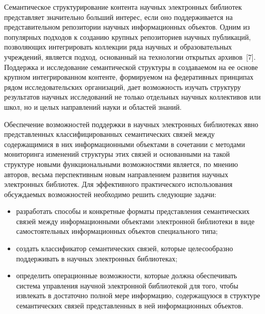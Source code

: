 \begin{multicols}{2}
     Семантическое структурирование контента научных электронных 
библиотек представляет значительно больший интерес, если оно 
поддерживается на представительном репозитории научных информационных 
объектов. Одним из популярных подходов к созданию крупных репозиториев 
научных публикаций, позволяющих интегрировать коллекции ряда научных и 
образовательных учреж\-де\-ний, является подход, основанный на технологии 
открытых архивов~[7]. Поддержка и исследование семантической структуры в 
создаваемом на ее основе крупном интегрированном контенте, формируемом 
на федеративных принципах рядом исследовательских организаций, дает 
возможность изучать структуру результатов научных исследований не только 
отдельных научных коллективов или школ, но и целых направлений науки и 
областей знаний. 
     
     Обеспечение возможностей поддержки в научных электронных 
библиотеках явно представленных классифицированных семантических связей 
между содержащимися в них информационными объектами в сочетании с 
методами мониторинга изменений структуры этих связей и основанными на 
такой структуре новыми функциональными возможностями является, по 
мнению авторов, весьма перспективным новым направлением развития 
научных электронных библиотек. Для эффективного практического 
использования обсуждаемых возможностей необходимо решить следующие 
задачи: 
     \begin{itemize}
\item разработать способы и конкретные форматы представления 
семантических связей между информационными объектами электронной 
библиотеки в виде самостоятельных информационных объектов 
специального типа;
\item создать классификатор семантических связей, которые 
целесообразно поддерживать в научных электронных библиотеках;
\item определить операционные возможности, которые должна 
обеспечивать система управления научной электронной библиотекой для 
того, чтобы извлекать в достаточно полной мере информацию, 
содержащуюся в структуре семантических связей представленных в ней 
информационных объектов. 
\end{itemize}


\end{multicols}
